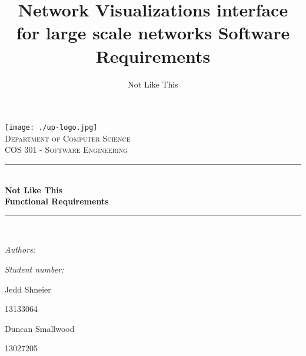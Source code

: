 \documentclass[a4paper,12pt]{report}
\author{Not Like This}
\title{ Network Visualizations interface for large scale networks Software Requirements}
\newcommand{\HRule}{\rule{\linewidth}{0.5mm}}
\begin{document}
\setlength{\parskip}{6pt}

\begin{titlepage}

\begin{center}
\texttt{[image: ./up-logo.jpg]}\\[0.4cm]    
\textsc{\LARGE Department of Computer Science}\\[1.5cm]
\textsc{\Large COS 301 - Software Engineering}\\[0.5cm]
\HRule \\[0.4cm]

{ \huge \bfseries Not Like This}
\\[0.4cm] 
{ \huge \bfseries Functional Requirements}\\[0.4cm]
\HRule \\[0.4cm]
\begin{minipage}{0.4\textwidth}
\begin{flushleft} \large
\emph{Authors:}
\end{flushleft}
\end{minipage}
\begin{minipage}{0.4\textwidth}
\begin{flushright} \large
\emph{Student number:}
\end{flushright}
\end{minipage}

\begin{minipage}{0.4\textwidth}
\begin{flushleft} \large
Jedd {Shneier}
\end{flushleft}
\end{minipage}
\begin{minipage}{0.4\textwidth}
\begin{flushright} \large
\emph{}
13133064
\end{flushright}
\end{minipage}

\begin{minipage}{0.4\textwidth}
\begin{flushleft} \large
Duncan {Smallwood}
\end{flushleft}
\end{minipage}
\begin{minipage}{0.4\textwidth}
\begin{flushright} \large
\emph{}
13027205
\end{flushright}
\end{minipage}


\end{center}
\end{titlepage}
\end{document}
